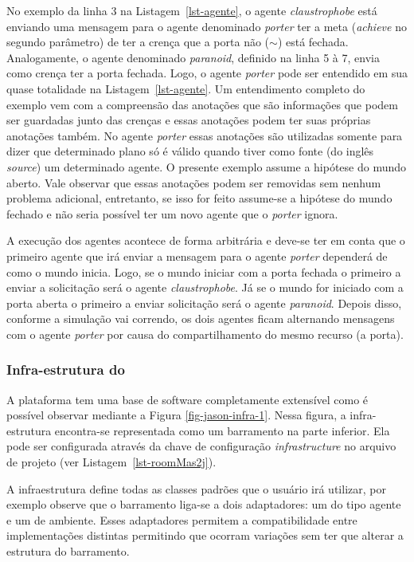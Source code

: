 No exemplo da linha 3 na Listagem~\ref{lst-agente}, o agente
\emph{claustrophobe} está enviando uma mensagem para o agente denominado
\emph{porter} ter a meta (\emph{achieve} no segundo parâmetro) de ter a crença
que a porta não ($\sim$) está fechada. Analogamente, o agente denominado
\emph{paranoid}, definido na linha 5 à 7, envia como crença ter a porta
fechada. Logo, o agente \emph{porter} pode ser entendido em sua quase
totalidade na Listagem~\ref{lst-agente}. Um entendimento completo do exemplo
vem com a compreensão das anotações que são informações que podem ser
guardadas junto das crenças e essas anotações podem ter suas próprias
anotações também. No agente \emph{porter} essas anotações são utilizadas
somente para dizer que determinado plano só é válido quando tiver como fonte
(do inglês \emph{source}) um determinado agente. O presente exemplo assume a
hipótese do mundo aberto. Vale observar que essas anotações podem ser
removidas sem nenhum problema adicional, entretanto, se isso for feito
assume-se a hipótese do mundo fechado e não seria possível ter um novo agente
que o \emph{porter} ignora.

A execução dos agentes acontece de forma arbitrária e deve-se ter em conta
que o primeiro agente que irá enviar a mensagem para o agente \emph{porter} dependerá
de como o mundo inicia. Logo, se o mundo iniciar com a porta fechada o primeiro
a enviar a solicitação será o agente \emph{claustrophobe}. Já se o mundo for iniciado
com a porta aberta o primeiro a enviar solicitação será o agente \emph{paranoid}.
Depois disso, conforme a simulação vai correndo, os dois agentes ficam alternando
mensagens com o agente \emph{porter} por causa do compartilhamento do mesmo
recurso (a porta).

\vfill

\subsubsection{Infra-estrutura do \jason} \label{sec-jason-architecture}

A plataforma \jason tem uma base de software completamente extensível como
é possível observar mediante a Figura \ref{fig-jason-infra-1}.
Nessa figura, a infra-estrutura encontra-se representada como um barramento
na parte inferior. Ela pode ser configurada através da chave de configuração
\emph{infrastructure} no arquivo de projeto (ver Listagem~\ref{lst-roomMas2j}).

A infraestrutura define todas as classes padrões que o usuário irá utilizar,
por exemplo observe que o barramento liga-se a dois adaptadores: um do tipo
agente e um de ambiente. Esses adaptadores permitem a compatibilidade entre
implementações distintas permitindo que ocorram variações sem ter que alterar
a estrutura do barramento.

